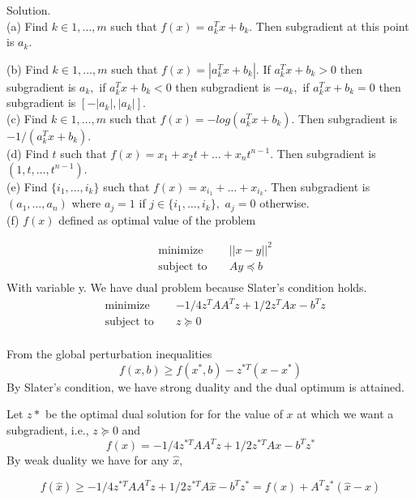 \documentclass{article}
\begin{document}
 Solution. \\
 
 (a) Find $k \in {1, \dots, m}$ such that 
 $f(x) = a_k^T x + b_k.$ Then subgradient at this point is $a_k.$
 
 (b) Find $k \in {1, \dots, m}$ such that 
 $f(x) = |a_k^T x + b_k|.$ If $a_k^T x + b_k > 0$ then subgradient 
 is $a_k,$ if $a_k^T x + b_k < 0$ then subgradient 
 is $- a_k,$ if $a_k^T x + b_k = 0$ then subgradient 
 is $[-|a_k|, |a_k|].$ \\
 
 (c) Find $k \in {1, \dots, m}$ such that 
 $f(x) = -log(a_k^T x + b_k).$ Then subgradient is 
 $- 1 / (a_k^T x + b_k).$\\
 

 (d) Find $t$ such that 
$f(x) = x_1 + x_2 t + \dots + x_n t^{n - 1}.$ Then subgradient is $(1, t, \dots , t^{n-1}).$ \\

 (e) Find $\{i_1, \dots, i_k\}$ such that 
 $f(x) = x_{i_1} + \dots + x_{i_k}.$ Then subgradient is
 $(a_1, \dots, a_n)$ where $a_j = 1$ if 
 $j \in \{i_1, \dots, i_k\},$ $a_j = 0$ otherwise. \\
 
  (f) $f(x)$ defined as optimal value of the problem
  
\begin{align*}
	&\text{minimize } && ||x - y||^2 \\
	&\text{subject to } && Ay \preceq b\\
\end{align*}
With variable y.
We have dual problem because Slater’s condition holds. 
\begin{align*}
	&\text{minimize } && 
	-1/4 z^TAA^Tz + 1/2 z^T A x - b^Tz \\
	&\text{subject to }  && z \succeq 0\\
\end{align*}

From the global perturbation inequalities 
$$
f(x, b) \geq f(x^*, b) - z^{*T}(x - x^*)
$$
By Slater’s condition, we have strong duality and the dual optimum is attained.

Let $z*$ be the optimal dual solution for for the value of $x$ at which we want a subgradient, i.e., $z \succeq 0$ and 
$$
f(x) = -1/4 z^{*T}AA^Tz + 1/2 z^{*T} A x - b^Tz^*
$$
By weak duality we have for any $\hat{x},$

$$
f(\hat x) \geq -1/4 z^{*T}AA^Tz + 1/2 z^{*T} A \hat x - b^Tz^* = f(x) + A^T z^* (\hat x - x)
$$
\end{document}
